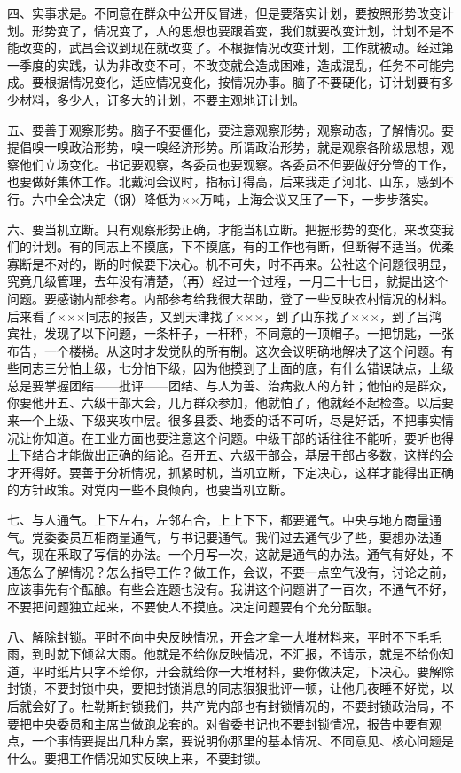 四、实事求是。不同意在群众中公开反冒进，但是要落实计划，要按照形势改变计划。形势变了，情况变了，人的思想也要跟着变，我们就要改变计划，计划不是不能改变的，武昌会议到现在就改变了。不根据情况改变计划，工作就被动。经过第一季度的实践，认为非改变不可，不改变就会造成困难，造成混乱，任务不可能完成。要根据情况变化，适应情况变化，按情况办事。脑子不要硬化，订计划要有多少材料，多少人，订多大的计划，不要主观地订计划。

五、要善于观察形势。脑子不要僵化，要注意观察形势，观察动态，了解情况。要提倡嗅一嗅政治形势，嗅一嗅经济形势。所谓政治形势，就是观察各阶级思想，观察他们立场变化。书记要观察，各委员也要观察。各委员不但要做好分管的工作，也要做好集体工作。北戴河会议时，指标订得高，后来我走了河北、山东，感到不行。六中全会决定（钢）降低为××万吨，上海会议又压了一下，一步步落实。

六、要当机立断。只有观察形势正确，才能当机立断。把握形势的变化，来改变我们的计划。有的同志上不摸底，下不摸底，有的工作也有断，但断得不适当。优柔寡断是不对的，断的时候要下决心。机不可失，时不再来。公社这个问题很明显，究竟几级管理，去年没有清楚，（再）经过一个过程，一月二十七日，就提出这个问题。要感谢内部参考。内部参考给我很大帮助，登了一些反映农村情况的材料。后来看了×××同志的报告，又到天津找了×××，到了山东找了×××，到了吕鸿宾社，发现了以下问题，一条杆子，一杆秤，不同意的一顶帽子。一把钥匙，一张布告，一个楼梯。从这时才发觉队的所有制。这次会议明确地解决了这个问题。有些同志三分怕上级，七分怕下级，因为他摸到了上面的底，有什么错误缺点，上级总是要掌握团结——批评——团结、与人为善、治病救人的方针；他怕的是群众，你要他开五、六级干部大会，几万群众参加，他就怕了，他就经不起检查。以后要来一个上级、下级夹攻中层。很多县委、地委的话不可听，尽是好话，不把事实情况让你知道。在工业方面也要注意这个问题。中级干部的话往往不能听，要听也得上下结合才能做出正确的结论。召开五、六级干部会，基层干部占多数，这样的会才开得好。要善于分析情况，抓紧时机，当机立断，下定决心，这样才能得出正确的方针政策。对党内一些不良倾向，也要当机立断。

七、与人通气。上下左右，左邻右合，上上下下，都要通气。中央与地方商量通气。党委委员互相商量通气，与书记要通气。我们过去通气少了些，要想办法通气，现在釆取了写信的办法。一个月写一次，这就是通气的办法。通气有好处，不通怎么了解情况？怎么指导工作？做工作，会议，不要一点空气没有，讨论之前，应该事先有个酝酿。有些会连题也没有。我讲这个问题讲了一百次，不通气不好，不要把问题独立起来，不要使人不摸底。决定问题要有个充分酝酿。

八、解除封锁。平时不向中央反映情况，开会才拿一大堆材料来，平时不下毛毛雨，到时就下倾盆大雨。他就是不给你反映情况，不汇报，不请示，就是不给你知道，平时纸片只字不给你，开会就给你一大堆材料，要你做决定，下决心。要解除封锁，不要封锁中央，要把封锁消息的同志狠狠批评一顿，让他几夜睡不好觉，以后就会好了。杜勒斯封锁我们，共产党内部也有封锁情况的，不要封锁政治局，不要把中央委员和主席当做跑龙套的。对省委书记也不要封锁情况，报告中要有观点，一个事情要提出几种方案，要说明你那里的基本情况、不同意见、核心问题是什么。要把工作情况如实反映上来，不要封锁。

